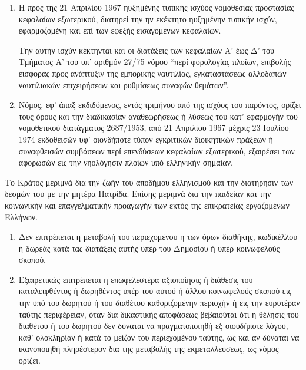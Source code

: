 \documentclass[twoside, a4paper, 10pt]{article}
\begin{document}
\begin{multicols}{2}
\begin{enumerate}
\begin{BigQuote}
\begin{enumerate}
  \item[1.] Η προς της 21 Απριλίου 1967 ηυξημένης  τυπικής ισχύος νομοθεσίας προστασίας κεφαλαίων εξωτερικού, διατηρεί την ην εκέκτητο ηυξημένην τυπικήν ισχύν, εφαρμοζομένη και επί των εφεξής εισαγομένων κεφαλαίων.
  
	Την αυτήν ισχύν κέκτηνται και οι διατάξεις των κεφαλαίων Α' έως Δ' του Τμήματος Α' του υπ' αριθμόν 27/75 νόμου “περί φορολογίας πλοίων, επιβολής εισφοράς προς ανάπτυξιν της εμπορικής ναυτιλίας, εγκαταστάσεως αλλοδαπών ναυτιλιακών επιχειρήσεων και ρυθμίσεως συναφών θεμάτων”.
  \item[2.] Νόμος, εφ' άπαξ εκδιδόμενος, εντός τριμήνου από της ισχύος του παρόντος, ορίζει τους όρους και την διαδικασίαν αναθεωρήσεως ή λύσεως του κατ' εφαρμογήν του νομοθετικού διατάγματος 2687/1953, από 21 Απριλίου 1967 μέχρις 23 Ιουλίου 1974 εκδοθεισών υφ' οιονδήποτε τύπον εγκριτικών διοικητικών πράξεων ή συναφθεισών συμβάσεων περί επενδύσεων κεφαλαίων εξωτερικού, εξαιρέσει των αφορωσών εις την νηολόγησιν πλοίων υπό ελληνικήν σημαίαν.
\end{enumerate}

Το Κράτος μεριμνά δια την ζωήν του αποδήμου ελληνισμού και την διατήρησιν των δεσμών του με την μητέρα Πατρίδα. Επίσης μεριμνά δια την παιδείαν και την κοινωνικήν και επαγγελματικήν προαγωγήν των εκτός της επικρατείας εργαζομένων Ελλήνων.

\begin{enumerate}
  \item[1.] Δεν επιτρέπεται η μεταβολή του περιεχομένου η των όρων διαθήκης, κωδικέλλου ή δωρεάς κατά τας διατάξεις αυτής υπέρ του Δημοσίου ή υπέρ κοινωφελούς σκοπού.
  \item[2.] Εξαιρετικώς επιτρέπεται η επωφελεστέρα αξιοποίησις ή διάθεσις του καταλειφθέντος ή δωρηθέντος υπέρ του αυτού ή άλλου κοινωφελούς σκοπού εις την υπό του δωρητού ή του διαθέτου καθοριζομένην περιοχήν ή εις την ευρυτέραν ταύτης περιφέρειαν, όταν δια δικαστικής αποφάσεως βεβαιούται ότι η θέλησις του διαθέτου ή του δωρητού δεν δύναται να πραγματοποιηθή εξ οιουδήποτε λόγου, καθ' ολοκληρίαν ή κατά το μείζον του περιεχομένου ταύτης, ως και αν δύναται να ικανοποιηθή πληρέστερον δια της μεταβολής της εκμεταλλεύσεως, ως νόμος ορίζει.
\end{enumerate}


\end{BigQuote}
\end{enumerate}
\end{multicols}
\end{document}
